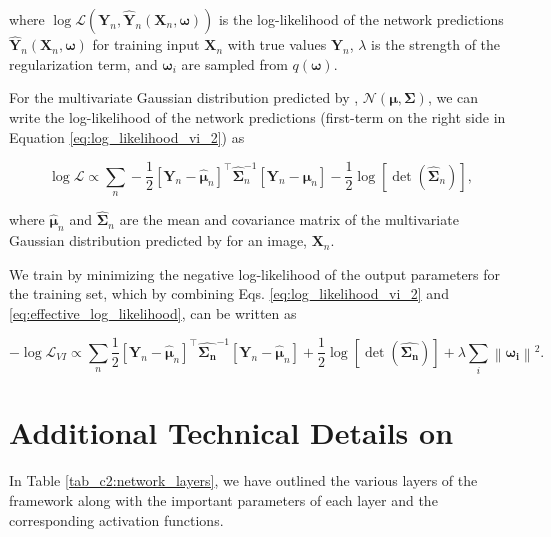 \noindent
where $\log \mathcal{L}\left(\boldsymbol{Y}_{n}, \boldsymbol{\hat{Y}}_{n}\left(\boldsymbol{X}_{n}, \boldsymbol{\omega}\right)\right)$ is the log-likelihood of the network predictions $\boldsymbol{\hat{Y}}_{n}\left(\boldsymbol{X}_{n}, \boldsymbol{\omega}\right)$ for training input $\boldsymbol{X}_n$ with true values $\boldsymbol{Y}_n$, $\lambda$ is the strength of the regularization term, and $\boldsymbol{\omega}_i$ are sampled from $q(\boldsymbol{\omega})$. 

For the multivariate Gaussian distribution predicted by \gampen{}, $\mathcal{N}(\boldsymbol{\mu}, \boldsymbol{\Sigma})$, we can write the log-likelihood of the network predictions (first-term on the right side in Equation \ref{eq:log_likelihood_vi_2}) as 

\begin{equation}
\log \mathcal{L} \propto  \sum_{n}  -\frac{1}{2}\left[\boldsymbol{Y}_{n}-\boldsymbol{\hat{\mu}}_{n}\right]^{\top} \boldsymbol{\hat{\Sigma}}_n^{-1}\left[\boldsymbol{Y}_{n}-\boldsymbol{\hat{\mu}}_{n}\right] -\frac{1}{2} \log [\operatorname{det}(\boldsymbol{\hat{\Sigma}}_n)] ,
\label{eq:effective_log_likelihood}
\end{equation}

\noindent
where $\boldsymbol{\hat{\mu}}_n$ and $\boldsymbol{\hat{\Sigma}}_n$ are the mean and covariance matrix of the multivariate Gaussian distribution predicted by \gampen{} for an image, $\boldsymbol{X}_n$. 

We train \gampen{} by minimizing the negative log-likelihood of the output parameters for the training set, which by combining Eqs. \ref{eq:log_likelihood_vi_2} and \ref{eq:effective_log_likelihood}, can be written as

\begin{equation}
- \log \mathcal{L}_{VI} \propto  \sum_{n} \frac{1}{2}\left[\boldsymbol{Y}_{n}-\boldsymbol{\hat{\mu}}_{n}\right]^{\top} \boldsymbol{\hat{\Sigma_n}}^{-1}\left[\boldsymbol{Y}_{n}-\boldsymbol{\hat{\mu}}_{n}\right] + \frac{1}{2} \log [\operatorname{det}(\boldsymbol{\hat{\Sigma_n}})] + \lambda \sum_{i}\left\|\boldsymbol{\omega_{i}}\right\|^{2} .
\label{eq:ap:final_loss_fn}
\end{equation}

\section{Additional Technical Details on \gampen{}}

In Table \ref{tab_c2:network_layers}, we have outlined the various layers of the \gampen{} framework along with the important parameters of each layer and the corresponding activation functions.


